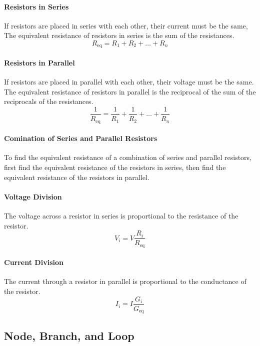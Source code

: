 \documentclass[11pt]{article}
\begin{document}
\paragraph{Resistors in Series} If resistors are placed in series with each other, their current must be the same, The equivalent resistance of resistors in series is the sum of the resistances.
\begin{equation}
    R_{\text{eq}} = R_1 + R_2 + \dots + R_n
\end{equation}
\paragraph{Resistors in Parallel} If resistors are placed in parallel with each other, their voltage must be the same. The equivalent resistance of resistors in parallel is the reciprocal of the sum of the reciprocals of the resistances.
\begin{equation}
    \frac{1}{R_{\text{eq}}} = \frac{1}{R_1} + \frac{1}{R_2} + \dots + \frac{1}{R_n}
\end{equation}
\paragraph{Comination of Series and Parallel Resistors} To find the equivalent resistance of a combination of series and parallel resistors, first find the equivalent resistance of the resistors in series, then find the equivalent resistance of the resistors in parallel.
\paragraph{Voltage Division} The voltage across a resistor in series is proportional to the resistance of the resistor.
\begin{equation}
    V_i = V \frac{R_i}{R_{\text{eq}}}
\end{equation}
\paragraph{Current Division} The current through a resistor in parallel is proportional to the conductance of the resistor.
\begin{equation}
    I_i = I \frac{G_i}{G_{\text{eq}}}
\end{equation}
\subsection{Node, Branch, and Loop}
\end{document}
